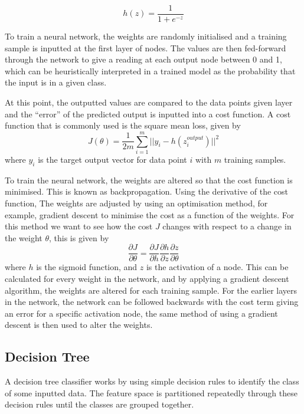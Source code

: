 \documentclass[a4paper,11pt,twoside]{article}
\begin{document}
\begin{equation}
h(z)=\frac{1}{1+e^{-z}}
\end{equation}

To train a neural network, the weights are randomly initialised and a training sample is inputted at the first layer of nodes. The values are then fed-forward through the network to give a reading at each output node between 0 and 1, which can be heuristically interpreted in a trained model as the probability that the input is in a given class. 
\newline

At this point, the outputted values are compared to the data points given layer and the “error” of the predicted output is inputted into a cost function. A cost function that is commonly used is the square mean loss, given by
\begin{equation}
J(\theta) = \frac{1}{2m}\sum_{i=1}^m ||y_i-h(z^{output}_i)||^2
\end{equation}
where $y_i$ is the target output vector for data point $i$ with $m$ training samples.
\newline

To train the neural network, the weights are altered so that the cost function is minimised.  This is known as backpropagation. Using the derivative of the cost function, The weights are adjusted by using an optimisation method, for example, gradient descent to minimise the cost as a function of the weights. For this method we want to see how the cost $J$ changes with respect to a change in the weight $\theta$, this is given by
\begin{equation}
\frac{\partial J}{\partial \theta} = \frac{\partial J}{\partial h} \frac{\partial h}{\partial z} \frac{\partial z}{\partial \theta}
\end{equation}
where $h$ is the sigmoid function, and $z$ is the activation of a node. This can be calculated for every weight in the network, and by applying a gradient descent algorithm, the weights are altered for each training sample. For the earlier layers in the network, the network can be followed backwards with the cost term giving an error for a specific activation node, the same method of using a gradient descent is then used to alter the weights.

\subsection{Decision Tree}

A decision tree classifier works by using simple decision rules to identify the class of some inputted data. The feature space is partitioned repeatedly through these decision rules until the classes are grouped together. 
\end{document}
